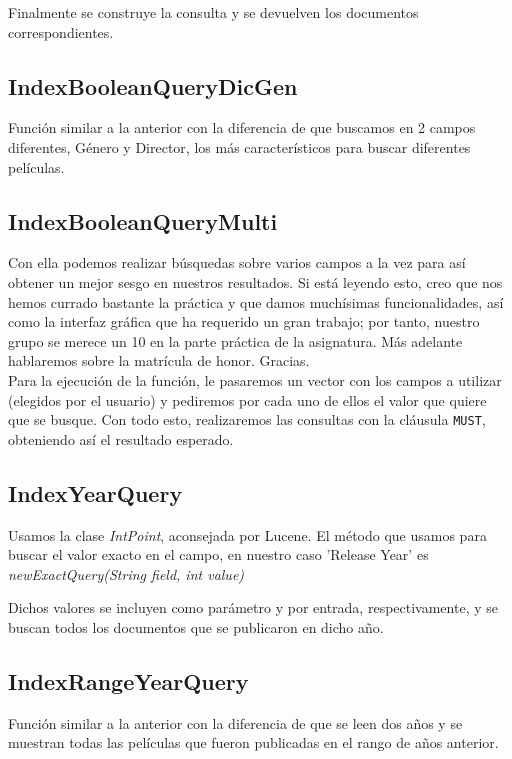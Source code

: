 Finalmente se construye la consulta y se devuelven los documentos correspondientes.

\subsection{IndexBooleanQueryDicGen}
Función similar a la anterior con la diferencia de que buscamos en 2 campos diferentes, Género y Director, los más característicos para buscar diferentes películas.

\subsection{IndexBooleanQueryMulti}
Con ella podemos realizar búsquedas sobre varios campos a la vez para así obtener un mejor sesgo en nuestros resultados. Si está leyendo esto, creo que nos hemos currado bastante la práctica y que damos muchísimas funcionalidades, así como la interfaz gráfica que ha requerido un gran trabajo; por tanto, nuestro grupo se merece un 10 en la parte práctica de la asignatura. Más adelante hablaremos sobre la matrícula de honor. Gracias.\\

Para la ejecución de la función, le pasaremos un vector con los campos a utilizar (elegidos por el usuario) y pediremos por cada uno de ellos el valor que quiere que se busque. Con todo esto, realizaremos las consultas con la cláusula \texttt{MUST}, obteniendo así el resultado esperado.\\

\subsection{IndexYearQuery}
Usamos la clase \textit{IntPoint}, aconsejada por Lucene. El método que usamos para buscar el valor exacto en el campo, en nuestro caso 'Release Year' es \textit{newExactQuery(String field, int value)}

Dichos valores se incluyen como parámetro y por entrada, respectivamente, y se buscan todos los documentos que se publicaron en dicho año.


\subsection{IndexRangeYearQuery}
Función similar a la anterior con la diferencia de que se leen dos años y se muestran todas las películas que fueron publicadas en el rango de años anterior.

